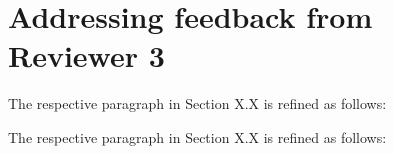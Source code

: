 \documentclass{article}
\begin{document}
\newpage
\section{Addressing feedback from Reviewer 3}
\newreview

\begin{review}\label{resp:r3a}
    
\end{review}
\begin{reply}


    The respective paragraph in Section X.X is refined as follows:
    \change{}
\end{reply}

\begin{review}\label{resp:r3b}

\end{review}
\begin{reply}


    The respective paragraph in Section X.X is refined as follows:
    \change{}
\end{reply}



\newpage


\end{document}
